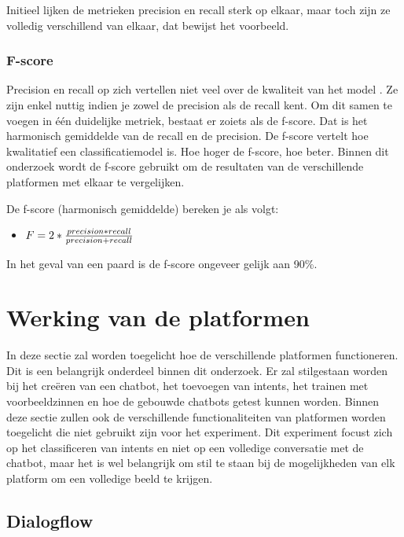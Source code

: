 Initieel lijken de metrieken precision en recall sterk op elkaar, maar toch zijn ze volledig verschillend van elkaar, dat bewijst het voorbeeld.

\subsubsection{F-score}

Precision en recall op zich vertellen niet veel over de kwaliteit van het model \autocite{Treml2019}. Ze zijn enkel nuttig indien je zowel de precision als de recall kent. Om dit samen te voegen in één duidelijke metriek, bestaat er zoiets als de f-score. Dat is het harmonisch gemiddelde van de recall en de precision. De f-score vertelt hoe kwalitatief een classificatiemodel is. Hoe hoger de f-score, hoe beter. Binnen dit onderzoek wordt de f-score gebruikt om de resultaten van de verschillende platformen met elkaar te vergelijken.

De f-score (harmonisch gemiddelde) bereken je als volgt:
\begin{itemize}
    \item $F= 2 * \frac{precision*recall}{precision+recall}\\$
\end{itemize}

In het geval van een paard is de f-score ongeveer gelijk aan 90\%.


\section{Werking van de platformen}
\label{sec:werking-platformen}


In deze sectie zal worden toegelicht hoe de verschillende platformen functioneren. Dit is een belangrijk onderdeel binnen dit onderzoek. Er zal stilgestaan worden bij het creëren van een chatbot, het toevoegen van intents, het trainen met voorbeeldzinnen en hoe de gebouwde chatbots getest kunnen worden. Binnen deze sectie zullen ook de verschillende functionaliteiten van platformen worden toegelicht die niet gebruikt zijn voor het experiment. Dit experiment focust zich op het classificeren van intents en niet op een volledige conversatie met de chatbot, maar het is wel belangrijk om stil te staan bij de mogelijkheden van elk platform om een volledige beeld te krijgen.

\subsection{Dialogflow}
\label{subsec:werking-platformen-dialogflow}

